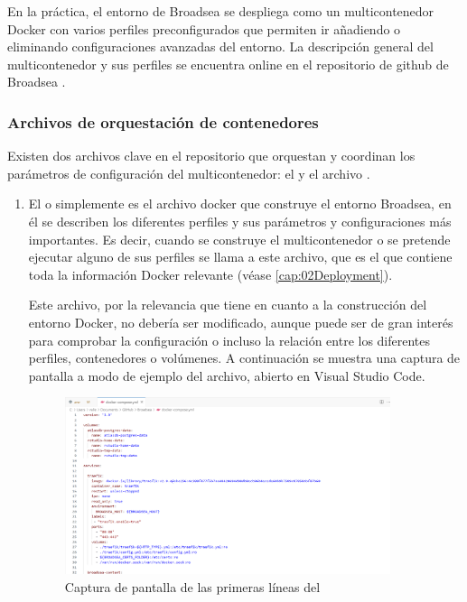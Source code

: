 En la práctica, el entorno de Broadsea se despliega como un multicontenedor Docker con varios perfiles preconfigurados que permiten ir añadiendo o eliminando configuraciones avanzadas del entorno. La descripción general del multicontenedor y sus perfiles se encuentra online en el repositorio de github de Broadsea \cite{githubBroadsea}.  

\subsubsection{Archivos de orquestación de contenedores}

Existen dos archivos clave en el repositorio que orquestan y coordinan los parámetros de configuración del multicontenedor: el  y el archivo .

\begin{enumerate}

    \item El  o simplemente  es el archivo docker que construye el entorno Broadsea, en él se describen los diferentes perfiles y sus parámetros y configuraciones más importantes. Es decir, cuando se construye el multicontenedor o se pretende ejecutar alguno de sus perfiles se llama a este archivo, que es el que contiene toda la información Docker relevante (véase \ref{cap:02Deployment}).

    Este archivo, por la relevancia que tiene en cuanto a la construcción del entorno Docker, no debería ser modificado, aunque puede ser de gran interés para comprobar la configuración o incluso la relación entre los diferentes perfiles, contenedores o volúmenes. A continuación se muestra una captura de pantalla a modo de ejemplo del archivo, abierto en Visual Studio Code.

\begin{figure}[H]
    \centering
    \includegraphics[width=0.90\textwidth]{figures/dockerCompose.png}
    \caption{Captura de pantalla de las primeras líneas del }
    \label{fig:dockerCompose}
\end{figure}


\end{enumerate}
